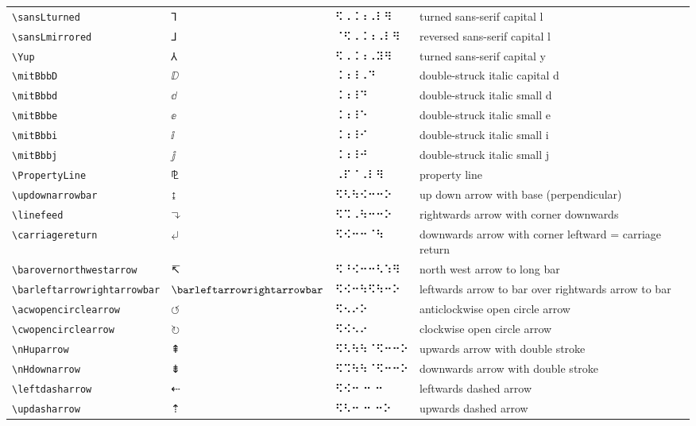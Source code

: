 \documentclass[oneside]{article}
\begin{document}
\begin{longtable}{llll}
\verb|\sansLturned| & $\sansLturned$ &  ⠫⠠⠨⠰⠠⠇⠻  & {turned sans-serif capital l} \\[2ex]
\verb|\sansLmirrored| & $\sansLmirrored$ &  ⠈⠫⠠⠨⠰⠠⠇⠻  & {reversed sans-serif capital l} \\[2ex]
\verb|\Yup| & $\Yup$ &  ⠫⠠⠨⠰⠠⠽⠻  & {turned sans-serif capital y} \\[2ex]
\verb|\mitBbbD| & $\mitBbbD$ &  ⠨⠰⠸⠠⠙  & {double-struck italic capital d} \\[2ex]
\verb|\mitBbbd| & $\mitBbbd$ &  ⠨⠰⠸⠙  & {double-struck italic small d} \\[2ex]
\verb|\mitBbbe| & $\mitBbbe$ &  ⠨⠰⠸⠑  & {double-struck italic small e} \\[2ex]
\verb|\mitBbbi| & $\mitBbbi$ &  ⠨⠰⠸⠊  & {double-struck italic small i} \\[2ex]
\verb|\mitBbbj| & $\mitBbbj$ &  ⠨⠰⠸⠚  & {double-struck italic small j} \\[2ex]
\verb|\PropertyLine| & $\PropertyLine$ &  ⠠⠏⠈⠠⠇⠻  & {property line} \\[2ex]
\verb|\updownarrowbar| & $\updownarrowbar$ &   ⠫⠣⠳⠪⠒⠒⠕   & {up down arrow with base (perpendicular)} \\[2ex]
\verb|\linefeed| & $\linefeed$ &   ⠫⠩⠠⠳⠒⠒⠕   & {rightwards arrow with corner downwards} \\[2ex]
\verb|\carriagereturn| & $\carriagereturn$ &   ⠫⠪⠒⠒⠈⠳   & {downwards arrow with corner leftward = carriage return} \\[2ex]
\verb|\barovernorthwestarrow| & $\barovernorthwestarrow$ &   ⠫⠘⠪⠒⠒⠣⠱⠻   & {north west arrow to long bar} \\[2ex]
\verb|\barleftarrowrightarrowbar| & $\barleftarrowrightarrowbar$ &   ⠫⠪⠒⠳⠫⠳⠒⠕   & {leftwards arrow to bar over rightwards arrow to bar} \\[2ex]
\verb|\acwopencirclearrow| & $\acwopencirclearrow$ &   ⠫⠢⠔⠕   & {anticlockwise open circle arrow} \\[2ex]
\verb|\cwopencirclearrow| & $\cwopencirclearrow$ &   ⠫⠪⠢⠔   & {clockwise open circle arrow} \\[2ex]
\verb|\nHuparrow| & $\nHuparrow$ &   ⠫⠣⠳⠳⠈⠫⠒⠒⠕   & {upwards arrow with double stroke} \\[2ex]
\verb|\nHdownarrow| & $\nHdownarrow$ &   ⠫⠩⠳⠳⠈⠫⠒⠒⠕   & {downwards arrow with double stroke} \\[2ex]
\verb|\leftdasharrow| & $\leftdasharrow$ &   ⠫⠪⠒ ⠒ ⠒   & {leftwards dashed arrow} \\[2ex]
\verb|\updasharrow| & $\updasharrow$ &   ⠫⠣⠒ ⠒ ⠒⠕   & {upwards dashed arrow} \\[2ex]

\end{longtable}
\end{document}
